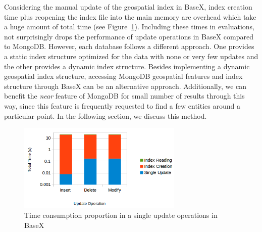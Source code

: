 \documentclass[a4paper,12pt]{article}
\begin{document}
Considering the manual update of the geospatial index in BaseX, %
index creation time plus reopening the index file into the main memory are overhead which take a huge amount of total time (see Figure~\ref{figBXUpdate}).
Including these times in evaluations, not surprisingly drops the performance of update operations in BaseX compared to MongoDB. However, each database follows a different approach. One provides a static index structure optimized for the data with none or very few updates and the other provides a dynamic index structure. 
Besides implementing a dynamic geospatial index structure, accessing MongoDB geospatial features and index structure through BaseX can be an alternative approach. Additionally, we can benefit the \textit{near} feature of MongoDB for small number of results through this way, since this feature is frequently requested to find a few entities around a particular point. In the following section, we discuss this method.



\begin{figure}
\centering
\includegraphics[width=0.7\textwidth]{BXUpdate.png}
\caption{Time consumption proportion in a single update operations in BaseX}
\label{figBXUpdate}
\end{figure}
\end{document}
